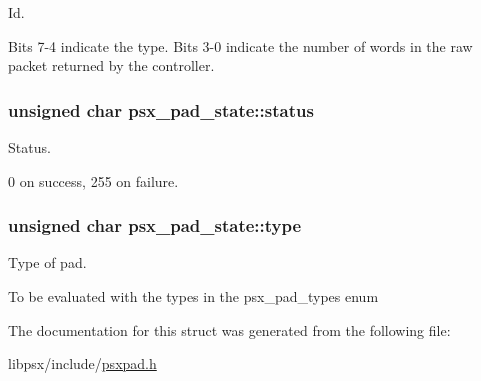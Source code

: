 Id. 

Bits 7-\/4 indicate the type. Bits 3-\/0 indicate the number of words in the raw packet returned by the controller. \hypertarget{structpsx__pad__state_ad8b7ccbbce9e28ca834162c302793bf5}{}
\subsubsection[{status}]{\setlength{\rightskip}{0pt plus 5cm}unsigned char psx\+\_\+pad\+\_\+state\+::status}\label{structpsx__pad__state_ad8b7ccbbce9e28ca834162c302793bf5}


Status. 

0 on success, 255 on failure. \hypertarget{structpsx__pad__state_a2241e697653b28ca45d2cbad682b7eba}{}
\subsubsection[{type}]{\setlength{\rightskip}{0pt plus 5cm}unsigned char psx\+\_\+pad\+\_\+state\+::type}\label{structpsx__pad__state_a2241e697653b28ca45d2cbad682b7eba}


Type of pad. 

To be evaluated with the types in the psx\+\_\+pad\+\_\+types enum 

The documentation for this struct was generated from the following file\+:\begin{DoxyCompactItemize}
\item 
libpsx/include/\hyperlink{psxpad_8h}{psxpad.\+h}\end{DoxyCompactItemize}
